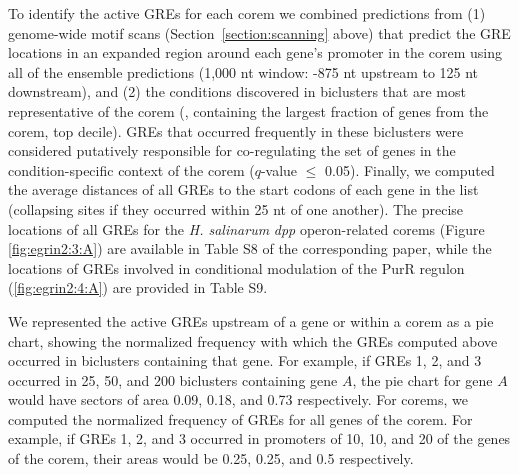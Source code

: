 To identify the active GREs for each corem we combined predictions from (1) genome-wide motif scans (Section~\ref{section:scanning} above) that predict the GRE locations in an expanded region around each gene’s promoter in the corem using all of the ensemble predictions (1,000 nt window: -875 nt upstream to 125 nt downstream), and (2) the conditions discovered in biclusters that are most representative of the corem (\ie, containing the largest fraction of genes from the corem, top decile). GREs that occurred frequently in these biclusters were considered putatively responsible for co-regulating the set of genes in the condition-specific context of the corem ($q$-value $\leq$ 0.05). Finally, we computed the average distances of all GREs to the start codons of each gene in the list (collapsing sites if they occurred within 25 nt of one another). The precise locations of all GREs for the {\it H. salinarum} \textit{dpp} operon-related corems (Figure \ref{fig:egrin2:3:A}) are available in Table S8 of the corresponding paper, while the locations of GREs involved in conditional modulation of the PurR regulon (\ref{fig:egrin2:4:A}) are provided in Table S9.

We represented the active GREs upstream of a gene or within a corem as a pie chart, showing the normalized frequency with which the GREs computed above occurred in biclusters containing that gene. For example, if GREs 1, 2, and 3 occurred in 25, 50, and 200 biclusters containing gene $A$, the pie chart for gene $A$ would have sectors of area 0.09, 0.18, and 0.73 respectively. For corems, we computed the normalized frequency of GREs for all genes of the corem. For example, if GREs 1, 2, and 3 occurred in promoters of 10, 10, and 20 of the genes of the corem, their areas would be 0.25, 0.25, and 0.5 respectively.

